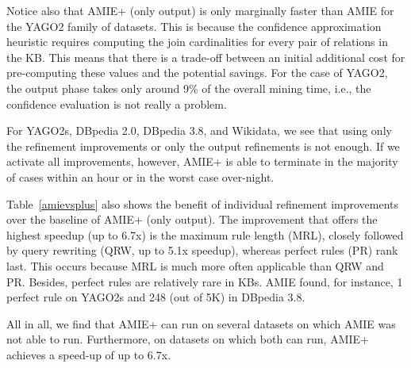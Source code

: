 Notice also that AMIE+ (only output) is only marginally faster than AMIE for the YAGO2 family of datasets. This is because the confidence approximation heuristic requires
computing the join cardinalities for every pair of relations in the KB. This means that there is a trade-off between an initial additional cost
for pre-computing these values and the potential savings. For the case of YAGO2, the output phase takes only around 9\%
of the overall mining time, i.e., the
confidence evaluation is not really a problem. %


For YAGO2s, DBpedia 2.0, DBpedia 3.8, and Wikidata, we see that using only the refinement improvements
or only the output refinements is not enough.
If we activate all improvements, however, AMIE+ is able to terminate in the
majority of cases within an hour or in the worst case over-night.

Table~\ref{amievsplus} also shows the benefit of individual refinement improvements over the baseline of AMIE+ (only output).
The improvement that offers the highest speedup (up to 6.7x) is the maximum rule length (MRL), closely followed by query rewriting (QRW, up to 5.1x speedup),
whereas perfect rules (PR) rank last.
This occurs because MRL is much more often applicable than QRW and PR.
Besides, perfect rules are relatively rare in KBs. AMIE found, for instance, 1 perfect rule on YAGO2s and 248 (out of 5K) in DBpedia 3.8.

All in all, we find that AMIE+ can run on several datasets on which AMIE was not able to run. Furthermore, on datasets on which both can run, AMIE+ achieves a speed-up of up to 6.7x.





